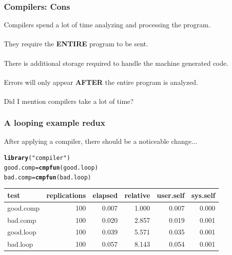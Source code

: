 \documentclass{beamer}\usepackage[]{graphicx}\usepackage[]{color}
\makeatletter
\newcommand{\hlstr}[1]{\textcolor[rgb]{0.192,0.494,0.8}{#1}}%
\newcommand{\hlstd}[1]{\textcolor[rgb]{0.345,0.345,0.345}{#1}}%
\newcommand{\hlkwb}[1]{\textcolor[rgb]{0.69,0.353,0.396}{#1}}%
\newcommand{\hlkwd}[1]{\textcolor[rgb]{0.737,0.353,0.396}{\textbf{#1}}}%
\newenvironment{kframe}{%
 \def\at@end@of@kframe{}%
 \ifinner\ifhmode%
  \def\at@end@of@kframe{\end{minipage}}%
  \begin{minipage}{\columnwidth}%
 \fi\fi%
 \def\FrameCommand##1{\hskip\@totalleftmargin \hskip-\fboxsep
 \colorbox{shadecolor}{##1}\hskip-\fboxsep
     \hskip-\linewidth \hskip-\@totalleftmargin \hskip\columnwidth}%
 \MakeFramed {\advance\hsize-\width
   \@totalleftmargin\z@ \linewidth\hsize
   \@setminipage}}%
 {\par\unskip\endMakeFramed%
 \at@end@of@kframe}
\newenvironment{knitrout}{}{} %
\makeatother
\begin{document}
\begin{frame}[fragile]
\frametitle{Compilers: Cons}

Compilers spend a lot of time analyzing and processing the program.\\$ $\\

They require the \textbf{ENTIRE} program to be sent.\\$ $\\

There is additional storage required to handle the machine generated code.\\$ $\\

Errors will only appear \textbf{AFTER} the entire program is analyzed.\\$ $\\

Did I mention compilers take a lot of time?

\end{frame}

\begin{frame}[fragile]
\frametitle{A looping example redux}
After applying a compiler, there should be a noticeable change...
\begin{knitrout}
\color{fgcolor}\begin{kframe}
\begin{alltt}
\hlkwd{library}\hlstd{(}\hlstr{"compiler"}\hlstd{)}
\hlstd{good.comp} \hlkwb{=} \hlkwd{cmpfun}\hlstd{(good.loop)}
\hlstd{bad.comp} \hlkwb{=} \hlkwd{cmpfun}\hlstd{(bad.loop)}
\end{alltt}
\end{kframe}
\end{knitrout}

\begin{center}
\begin{knitrout}
\color{fgcolor}
\begin{tabular}{l|r|r|r|r|r}
\hline
test & replications & elapsed & relative & user.self & sys.self\\
\hline
good.comp & 100 & 0.007 & 1.000 & 0.007 & 0.000\\
\hline
bad.comp & 100 & 0.020 & 2.857 & 0.019 & 0.001\\
\hline
good.loop & 100 & 0.039 & 5.571 & 0.035 & 0.001\\
\hline
bad.loop & 100 & 0.057 & 8.143 & 0.054 & 0.001\\
\hline
\end{tabular}


\end{knitrout}
\end{center}
\end{frame}
\end{document}
